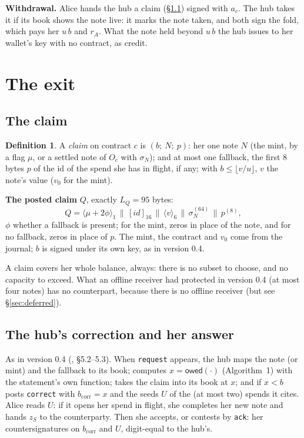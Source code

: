 \documentclass[11pt]{article}
\theoremstyle{plain}
\theoremstyle{definition}
\newtheorem{definition}{Definition}
\newcommand{\bcorr}{b_{\mathrm{corr}}}
\newcommand{\tx}[1]{\texttt{#1}}
\newcommand{\be}[2]{\langle #1\rangle_{#2}}
\newcommand{\pre}[2]{[#1]_{#2}}
\newcommand{\owed}{\mathsf{owed}}
\newcommand{\Oc}{O_c}
\begin{document}
\textbf{Withdrawal.} Alice hands the hub a claim (\S\ref{sec:claim})
signed with $a_c$. The hub takes it if its book shows the note live: it
marks the note taken, and both sign the fold, which pays her $u\,b$ and
$r_A$. What the note held beyond $u\,b$ the hub issues to her wallet's
key with no contract, as credit.

\section{The exit}\label{sec:exit}

\subsection{The claim}\label{sec:claim}

\begin{definition}
A \emph{claim} on contract $c$ is $(b;\ N;\ p)$: her one note $N$ (the
mint, by a flag $\mu$, or a settled note of $\Oc$ with $\sigma_N$); and
at most one fallback, the first 8 bytes $p$ of the id of the spend she
has in flight, if any; with $b \le \lfloor v/u \rfloor$, $v$ the note's
value ($v_0$ for the mint).
\end{definition}

\textbf{The posted claim} $Q$, exactly $L_Q = 95$ bytes:
\[
  Q = \be{\mu + 2\phi}{1} \,\|\, \pre{\mathit{id}}{16} \,\|\,
  \be{v}{6} \,\|\, \sigma_N^{(64)} \,\|\, p^{(8)},
\]
$\phi$ whether a fallback is present; for the mint, zeros in place of
the note, and for no fallback, zeros in place of $p$. The mint, the
contract and $v_0$ come from the journal; $b$ is signed under its own
key, as in version 0.4.

A claim covers her whole balance, always: there is no subset to choose,
and no capacity to exceed. What an offline receiver had protected in
version 0.4 (at most four notes) has no counterpart, because there is
no offline receiver (but see \S\ref{sec:deferred}).

\subsection{The hub's correction and her answer}\label{sec:correct}

As in version 0.4 (\cite{grants04}, \S5.2--5.3). When \tx{request}
appears, the hub maps the note (or mint) and the fallback to its book;
computes $x = \owed(\cdot)$ (Algorithm~1) with the statement's own
function; takes the claim into its book at $x$; and if $x < b$ posts
\tx{correct} with $\bcorr = x$ and the seeds $U$ of the (at most two)
spends it cites. Alice reads $U$: if it opens her spend in flight, she
completes her new note and hands $z_S$ to the counterparty. Then she
accepts, or contests by \tx{ack}: her countersignatures on $\bcorr$ and
$U$, digit-equal to the hub's.
\end{document}
